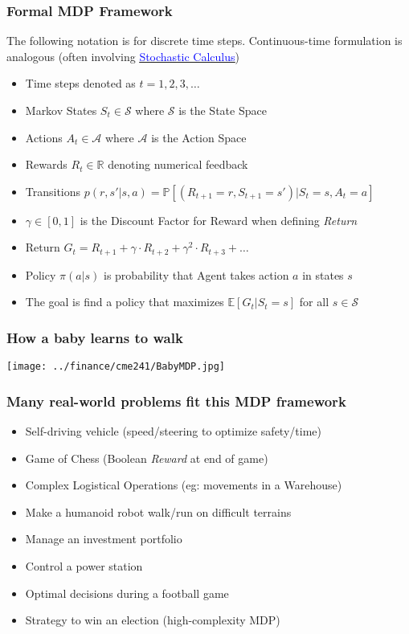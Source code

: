 \documentclass[handout]{beamer}
\begin{document}
\begin{frame}
\frametitle{Formal MDP Framework}
The following notation is for discrete time steps. Continuous-time formulation is analogous (often involving
\href{https://github.com/coverdrive/technical-documents/blob/master/finance/cme241/StochasticCalculusFoundations.pdf}{\underline{\textcolor{blue}{Stochastic Calculus}}})
\pause
\begin{itemize}[<+->]
\item Time steps denoted as $t = 1, 2, 3, \ldots$
\item Markov States $S_t \in \mathcal{S}$ where $\mathcal{S}$ is the State Space
\item Actions $A_t \in \mathcal{A}$ where $\mathcal{A}$ is the Action Space
\item Rewards $R_t \in \mathbb{R}$ denoting numerical feedback\
\item Transitions $p(r,s'|s,a) = \mathbb{P}[(R_{t+1}=r,S_{t+1}=s')|S_t=s,A_t=a]$
\item $\gamma \in [0,1]$ is the Discount Factor for Reward when defining {\em Return}
\item Return $G_t = R_{t+1} + \gamma \cdot R_{t+2} + \gamma^2 \cdot R_{t+3} + \ldots$
\item Policy $\pi(a|s)$ is probability that Agent takes action $a$ in states $s$
\item The goal is find a policy that maximizes  $\mathbb{E}[G_t|S_t = s]$ for all $s \in \mathcal{S}$
\end{itemize}
\end{frame}

\begin{frame}
\frametitle{How a baby learns to walk}
\texttt{[image: ../finance/cme241/BabyMDP.jpg]}
\end{frame}

\begin{frame}
\frametitle{Many real-world problems fit this MDP framework}
\pause
\begin{itemize}[<+->]
\item Self-driving vehicle (speed/steering to optimize safety/time)
\item Game of Chess (Boolean {\em Reward} at end of game)
\item Complex Logistical Operations (eg: movements in a Warehouse)
\item Make a humanoid robot walk/run on difficult terrains
\item Manage an investment portfolio
\item Control a power station
\item Optimal decisions during a football game
\item Strategy to win an election (high-complexity MDP)
\end{itemize}
\end{frame}
\end{document}
